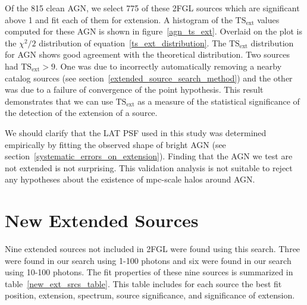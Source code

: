 \documentclass[12pt,preprint]{aastex}
\newcommand{\gev}{\text{GeV}\xspace}
\newcommand{\tsext}{{\ensuremath{\text{TS}_{\text{ext}}}}\xspace}
\begin{document}
Of the 815 clean AGN, we select 775 of these 2FGL sources which
are significant above 1 \gev and fit each of them for extension.
A histogram of the \tsext values computed for these AGN is
shown in figure~\ref{agn_ts_ext}. Overlaid on the plot is the
$\chi^2/2$ distribution of equation~\ref{ts_ext_distribution}.
The \tsext distribution for AGN shows good agreement with the
theoretical distribution.  Two sources had $\tsext>9$.  One was due
to incorrectly automatically removing a nearby catalog sources (see
section~\ref{extended_source_search_method}) and the other was due to a
failure of convergence of the point hypothesis.  This result demonstrates
that we can use \tsext as a measure of the statistical significance of
the detection of the extension of a source.

We should clarify that the LAT PSF used in this study was determined
empirically by fitting the observed shape of bright AGN (see
section~\ref{systematic_errors_on_extension}). Finding that the AGN we
test are not extended is not surprising.  This validation analysis is
not suitable to reject any hypotheses about the existence of mpc-scale
halos around AGN.

\section{New Extended Sources}
\label{new_ext_srcs_section}



Nine extended sources not included in 2FGL were found using this search.
Three were found in our search using 1-100 \gev photons and six were
found in our search using 10-100 \gev photons.  The fit properties of
these nine sources is summarized in table~\ref{new_ext_srcs_table}.
This table includes for each source the best fit position, extension,
spectrum, source significance, and significance of extension.
\end{document}
